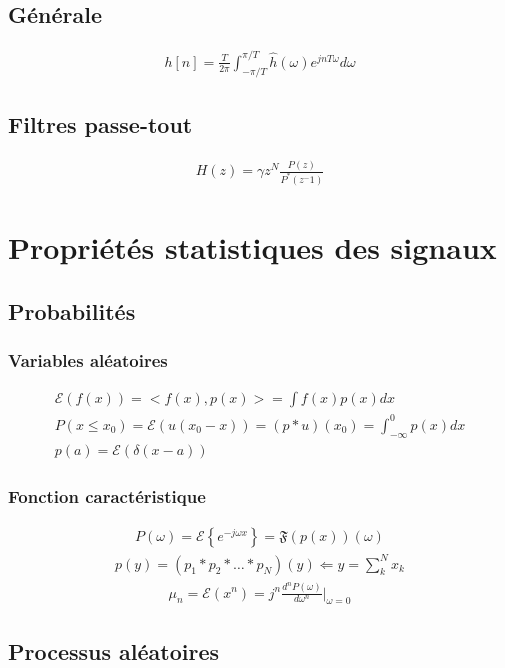 \documentclass[a4paper]{amsart}
\begin{document}
\subsection{Générale}
\begin{eqnarray}
	h[n]=\frac{T}{2\pi}\int_{-\pi/T}^{\pi/T}\hat h(\omega)e^{jnT\omega}d\omega
\end{eqnarray}
\subsection{Filtres passe-tout}
\begin{eqnarray}
	H(z)=\gamma z^N\frac{P(z)}{P^*(z^-1)}
\end{eqnarray}
\section{Propriétés statistiques des signaux}
\subsection{Probabilités}
\subsubsection{Variables aléatoires}
\begin{eqnarray}
	\mathcal{E}(f(x))=<f(x),p(x)>=\int f(x)p(x)dx\\
	P(x\leq x_0)=\mathcal{E}(u(x_0-x))=(p*u)(x_0)=\int_{-\infty}^{0}p(x)dx\\
	p(a)=\mathcal{E}(\delta(x-a))
\end{eqnarray}
\subsubsection{Fonction caractéristique}
\begin{eqnarray}
	P(\omega)=\mathcal{E}\left\{e^{-j\omega x}\right\}=\mathfrak{F}(p(x))(\omega)
\end{eqnarray}
\begin{eqnarray}
	p(y)=(p_1*p_2*\dots*p_N)(y)\Leftarrow y = \sum_k^N x_k
\end{eqnarray}
\begin{eqnarray}
	\mu_n=\mathcal{E}(x^n)=j^n\frac{d^nP(\omega)}{d\omega^n}\bigg|_{\omega=0}
\end{eqnarray}

\subsection{Processus aléatoires}
\end{document}
